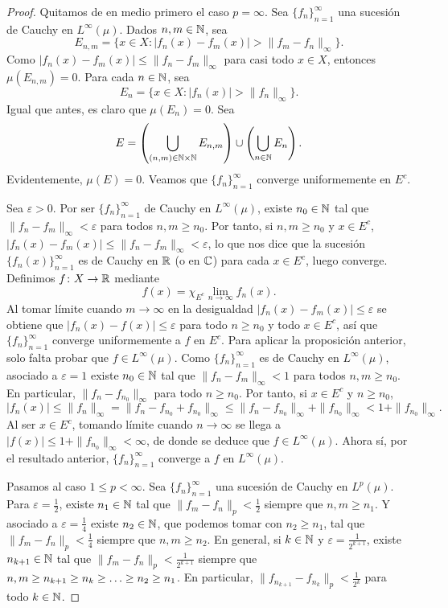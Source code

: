 \documentclass[a4paper, 11pt, oneside]{report}
\begin{document}
\begin{proof}
  Quitamos de en medio primero el caso $p = \infty$. Sea $\{f_n\}_{n=1}^\infty$ una sucesión de Cauchy en $L^\infty(\mu)$. Dados $n,m\in\mathbb N$, sea
  \[E_{n,m} = \{x \in X \colon |f_n(x)-f_m(x)| > \|f_m-f_n\|_{\infty}\}.\]
  Como $|f_n(x)-f_m(x)| \leq \|f_n-f_m\|_\infty$ para casi todo $x \in X$, entonces $\mu(E_{n,m}) = 0$. Para cada $n \in \mathbb N$, sea
  \[E_n = \{x \in X \colon |f_n(x)| > \|f_n\|_\infty\}.\]
  Igual que antes, es claro que $\mu(E_n) = 0$. Sea
  \[E = \left(\bigcup_{(n,m) \in \mathbb N \times \mathbb N} E_{n,m}\right) \cup \left(\bigcup_{n \in \mathbb N} E_n\right).\]
  Evidentemente, $\mu(E)=0$. Veamos que $\{f_n\}_{n=1}^\infty$ converge uniformemente en $E^c$.
  
  Sea $\varepsilon > 0$. Por ser $\{f_n\}_{n=1}^\infty$ de Cauchy en $L^\infty(\mu)$, existe $n_0\in\mathbb N$ tal que $\|f_n-f_m\|_\infty < \varepsilon$ para todos $n,m\geq n_0$. Por tanto, si $n,m \geq n_0$ y $x \in E^c$, $|f_n(x)-f_m(x)| \leq \|f_n-f_m\|_\infty < \varepsilon$, lo que nos dice que la sucesión $\{f_n(x)\}_{n=1}^\infty$ es de Cauchy en $\mathbb R$ (o en $\mathbb C$) para cada $x \in E^c$, luego converge. Definimos $f \colon X \to \mathbb R$ mediante \[f(x)=\chi_{E^c}\lim_{n\to\infty}f_n(x).\] Al tomar límite cuando $m \to \infty$ en la desigualdad $|f_n(x)-f_m(x)| \leq \varepsilon$
  se obtiene que $|f_n(x)-f(x)| \leq \varepsilon$ para todo $n \geq n_0$ y todo $x \in E^c$, así que $\{f_n\}_{n=1}^\infty$ converge uniformemente a $f$ en $E^c$. Para aplicar la proposición anterior, solo falta probar que $f \in L^\infty(\mu)$. Como $\{f_n\}_{n=1}^\infty$ es de Cauchy en $L^\infty(\mu)$, asociado a $\varepsilon = 1$ existe $n_0\in\mathbb N$ tal que $\|f_n-f_m\|_\infty < 1$ para todos $n,m\geq n_0$. En particular, $\|f_n-f_{n_0}\|_\infty$ para todo $n \geq n_0$. Por tanto, si $x \in E^c$ y $n \geq n_0$,
  \[|f_n(x)| \leq \|f_n\|_\infty=\|f_n-f_{n_0}+f_{n_0}\|_\infty \leq \|f_n-f_{n_0}\|_\infty+\|f_{n_0}\|_\infty < 1 + \|f_{n_0}\|_\infty.\]
  Al ser $x \in E^c$, tomando límite cuando $n \to \infty$ se llega a $|f(x)|\leq 1+\|f_{n_0}\|_\infty<\infty$, de donde se deduce que $f \in L^\infty(\mu)$. Ahora sí, por el resultado anterior, $\{f_n\}_{n=1}^\infty$ converge a $f$ en $L^\infty(\mu)$.

  Pasamos al caso $1 \leq p < \infty$. Sea $\{f_n\}_{n=1}^\infty$ una sucesión de Cauchy en $L^p(\mu)$. Para $\varepsilon = \frac{1}{2}$, existe $n_1 \in \mathbb N$ tal que $\|f_m-f_n\|_p < \frac{1}{2}$ siempre que $n,m\geq n_1$. Y asociado a $\varepsilon = \frac{1}{4}$ existe $n_2 \in \mathbb N$, que podemos tomar con $n_2 \geq n_1$, tal que $\|f_m-f_n\|_p < \frac{1}{4}$ siempre que $n,m \geq n_2$. En general, si $k \in \mathbb N$ y $\varepsilon = \frac{1}{2^{k+1}}$, existe $n_{k+1}\in \mathbb N$ tal que $\|f_m-f_n\|_p<\frac{1}{2^{k+1}}$ siempre que $n,m \geq n_{k+1} \geq n_k \geq \mathellipsis \geq n_2 \geq n_1$. En particular, $\|f_{n_{k+1}}-f_{n_k}\|_p < \frac{1}{2^k}$ para todo $k \in \mathbb N$.


\end{proof}
\end{document}
